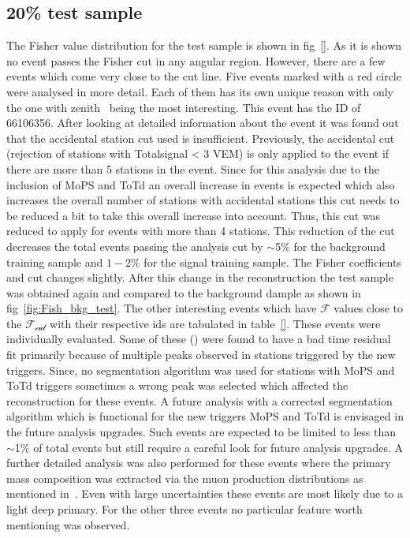 \subsection{20\% test sample}
\label{subsec:unblind_20}


The Fisher value distribution for the test sample is shown in fig~\ref{}. As it is shown no event passes the Fisher cut in any angular region. However, there are a few events which come very close to the cut line. Five events marked with a red circle were analysed in more detail. Each of them has its own unique reason with only the one with zenith~ being the most interesting. This event has the ID of 66106356. After looking at detailed information about the event it was found out that the accidental station cut used is insufficient. Previously, the  accidental cut (rejection of stations with Totalsignal < 3 VEM) is only applied to the event if there are more than 5 stations in the event. Since for this analysis due to the inclusion of MoPS and ToTd an overall increase in events is expected which also increases the overall number of stations with accidental stations this cut needs to be reduced a bit to take this overall increase into account. Thus, this cut was reduced to apply for events with more than 4 stations. This reduction of the cut decreases the total events passing the analysis cut by $\sim$5\% for the background training sample and $1-2$\% for the signal training sample. The Fisher coefficients and cut changes slightly. After this change in the reconstruction the test sample was obtained again and compared to the background dample as shown in fig~\ref{fig:Fish_bkg_test}. The other interesting events which have $\mathcal{F}$ values close to the $\mathcal{F_{cut}}$ with their respective ids are tabulated in table~\ref{}. These events were individually evaluated. Some of these () were found to have a bad time residual fit primarily because of multiple peaks observed in stations triggered by the new triggers. Since, no segmentation algorithm was used for stations with MoPS and ToTd triggers sometimes a wrong peak was selected which affected the reconstruction for these events. A future analysis with a corrected segmentation algorithm which is functional for the new triggers MoPS and ToTd is envisaged in the future analysis upgrades. Such events are expected to be limited to less than $\sim$1\% of total events but still require a careful look for future analysis upgrades. A further detailed analysis was also performed for these events where the primary mass composition was extracted via the muon production distributions as mentioned in~\cite{PierreAuger:2014zay}. Even with large uncertainties these events are most likely due to a light deep primary. For the other three events no particular feature worth mentioning was observed. 

